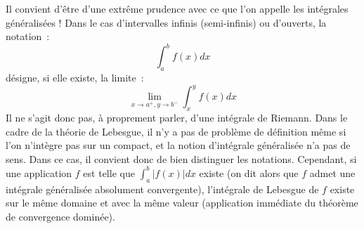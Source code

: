 \begin{rem}
Il convient d'être d'une extrême prudence avec ce que l'on appelle les
intégrales généralisées !
Dans le cas d'intervalles infinis (semi-infinis) ou d'ouverts, la
notation~:
\[
\int_a^b f(x) dx
\]
désigne, si elle existe, la limite~:
\[
\lim_{x\to a^+, y \to b^-} \int_x^y f(x) dx
\]
Il ne s'agit donc pas, à proprement parler, d'une intégrale de
Riemann. Dans le cadre de la théorie de Lebesgue, il n'y a pas de
problème de définition même si l'on n'intègre pas sur un compact, et la
notion d'intégrale généralisée n'a pas de sens. Dans ce cas, il
convient donc de bien distinguer les notations. Cependant, si une
application $f$ est telle que $\int_a^b |f(x)|dx$ existe (on dit alors
que $f$ admet une intégrale généralisée absolument convergente),
l'intégrale de Lebesgue de $f$ existe sur le même domaine et avec la
même valeur (application immédiate du théorème de convergence dominée).
\end{rem}